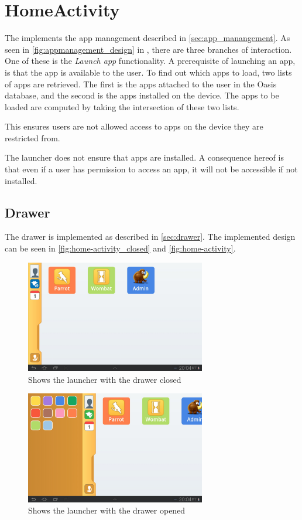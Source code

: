 \section{HomeActivity}
The  implements the app management described in \autoref{sec:app_manangement}. 
As seen in \autoref{fig:appmanagement_design} in , there are three branches of interaction. 
One of these is the \emph{Launch app} functionality.
A prerequisite of launching an app, is that the app is available to the user. 
To find out which apps to load, two lists of apps are retrieved. 
The first is the apps attached to the user in the Oasis database, and the second is the apps installed on the device.
The apps to be loaded are computed by taking the intersection of these two lists.

This ensures users are not allowed access to apps on the device they are restricted from.

The launcher does not ensure that apps are installed. 
A consequence hereof is that even if a user has permission to access an app, it will not be accessible if not installed.

\subsection{Drawer}
The drawer is implemented as described in \autoref{sec:drawer}.
The implemented design can be seen in \autoref{fig:home-activity_closed} and \autoref{fig:home-activity}.

\begin{figure}[h!]
	\centering
	\includegraphics[width=0.7\textwidth]{gfx/implementation-home-drawerclosed}
	\caption{Shows the launcher with the drawer closed}
	\label{fig:home-activity_closed}
\end{figure}

\begin{figure}[h!]
	\centering
	\includegraphics[width=0.7\textwidth]{gfx/implementation-home-draweropen}
	\caption{Shows the launcher with the drawer opened}
	\label{fig:home-activity}
\end{figure}

